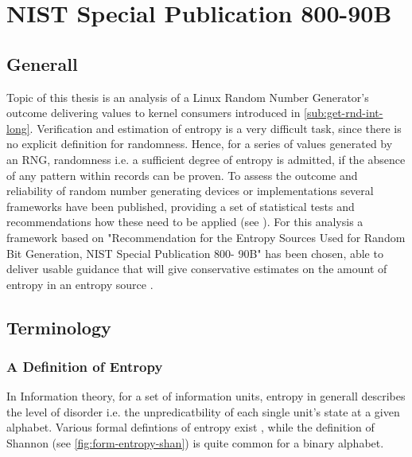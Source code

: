 \chapter{NIST Special Publication 800-90B}
\label{chap:NIST800-90B}
\section{Generall}

Topic of this thesis is an analysis of a Linux Random Number Generator's outcome delivering values to kernel consumers introduced in \ref{sub:get-rnd-int-long}. Verification and estimation of entropy is 
a very difficult task, since there is no explicit definition for randomness. Hence, for a series of values generated by an RNG, randomness i.e. a sufficient degree of entropy is admitted, if the absence of any pattern within records can be proven.
To assess the outcome and reliability of random number generating devices or implementations several frameworks have been published, providing a set of statistical tests and recommendations how these need to be applied (see \cite{robert2006dieharder, rukhin2001statistical, turan2018nist}).
For this analysis a framework based on "Recommendation for the Entropy Sources Used for Random Bit Generation, NIST Special Publication 800- 90B" \cite{turan2018nist} has been chosen, able to deliver
usable guidance that will give conservative estimates on the amount of entropy in an entropy
source \cite{turan2015random}.


\section{Terminology}
\subsection{A Definition of Entropy}
In Information theory, for a set of information units, entropy in generall describes the level of disorder i.e. the unpredicatbility of each single unit's state at a given alphabet. Various formal defintions of entropy exist \cite{hagerty2012entropy}, while the definition of Shannon (see \ref{fig:form-entropy-shan}) is quite common for a binary alphabet. 

